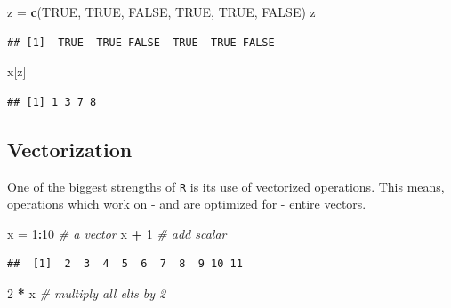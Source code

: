 \documentclass[]{book}
\newenvironment{Shaded}{\begin{snugshade}}{\end{snugshade}}
\newcommand{\KeywordTok}[1]{\textcolor[rgb]{0.13,0.29,0.53}{\textbf{#1}}}
\newcommand{\DecValTok}[1]{\textcolor[rgb]{0.00,0.00,0.81}{#1}}
\newcommand{\StringTok}[1]{\textcolor[rgb]{0.31,0.60,0.02}{#1}}
\newcommand{\CommentTok}[1]{\textcolor[rgb]{0.56,0.35,0.01}{\textit{#1}}}
\newcommand{\OtherTok}[1]{\textcolor[rgb]{0.56,0.35,0.01}{#1}}
\newcommand{\OperatorTok}[1]{\textcolor[rgb]{0.81,0.36,0.00}{\textbf{#1}}}
\newcommand{\NormalTok}[1]{#1}
\theoremstyle{definition}
\theoremstyle{definition}
\theoremstyle{definition}
\theoremstyle{remark}
\begin{document}
\begin{Shaded}
\begin{Highlighting}[]
\NormalTok{z =}\StringTok{ }\KeywordTok{c}\NormalTok{(}\OtherTok{TRUE}\NormalTok{, }\OtherTok{TRUE}\NormalTok{, }\OtherTok{FALSE}\NormalTok{, }\OtherTok{TRUE}\NormalTok{, }\OtherTok{TRUE}\NormalTok{, }\OtherTok{FALSE}\NormalTok{)}
\NormalTok{z}
\end{Highlighting}
\end{Shaded}

\begin{verbatim}
## [1]  TRUE  TRUE FALSE  TRUE  TRUE FALSE
\end{verbatim}

\begin{Shaded}
\begin{Highlighting}[]
\NormalTok{x[z]}
\end{Highlighting}
\end{Shaded}

\begin{verbatim}
## [1] 1 3 7 8
\end{verbatim}

\subsection{Vectorization}\label{vectorization}

One of the biggest strengths of \texttt{R} is its use of vectorized
operations. This means, operations which work on - and are optimized for
- entire vectors.

\begin{Shaded}
\begin{Highlighting}[]
\NormalTok{x =}\StringTok{ }\DecValTok{1}\OperatorTok{:}\DecValTok{10}  \CommentTok{# a vector}
\NormalTok{x }\OperatorTok{+}\StringTok{ }\DecValTok{1}     \CommentTok{# add scalar}
\end{Highlighting}
\end{Shaded}

\begin{verbatim}
##  [1]  2  3  4  5  6  7  8  9 10 11
\end{verbatim}

\begin{Shaded}
\begin{Highlighting}[]
\DecValTok{2} \OperatorTok{*}\StringTok{ }\NormalTok{x     }\CommentTok{# multiply all elts by 2}
\end{Highlighting}
\end{Shaded}
\end{document}
